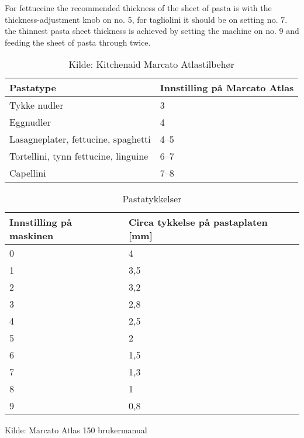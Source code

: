 For fettuccine the recommended thickness of the sheet of pasta is with the  thickness-adjustment knob on no. 5, for tagliolini it should
be on setting no. 7.
the thinnest pasta sheet thickness is achieved by setting the machine
on no. 9 and feeding the sheet of pasta through twice.\\


\begin{table}[]
\centering
\begin{tabular}{ll}
\hline
Pastatype                            & Innstilling på Marcato Atlas \\ \hline
Tykke nudler                         & 3                            \\
Eggnudler                            & 4                            \\
Lasagneplater, fettucine, spaghetti  & 4--5                         \\
Tortellini, tynn fettucine, linguine & 6--7                         \\
Capellini                            & 7--8                         \\ \hline
\end{tabular}
\caption{Kilde: Kitchenaid Marcato Atlastilbehør}
\label{pastatyper}
\end{table}


\begin{table}[]
\centering
\begin{tabular}{ll}
\hline
Innstilling på maskinen & Circa tykkelse på pastaplaten [mm] \\ \hline
0                       & 4                                              \\
1                       & 3,5                                            \\
2                       & 3,2                                            \\
3                       & 2,8                                            \\
4                       & 2,5                                            \\
5                       & 2                                              \\
6                       & 1,5                                            \\
7                       & 1,3                                            \\
8                       & 1                                              \\
9                       & 0,8                                            \\ \hline
\end{tabular}
\caption{Pastatykkelser}
\label{pastatykkelser}
\end{table}

Kilde: Marcato Atlas 150 brukermanual
